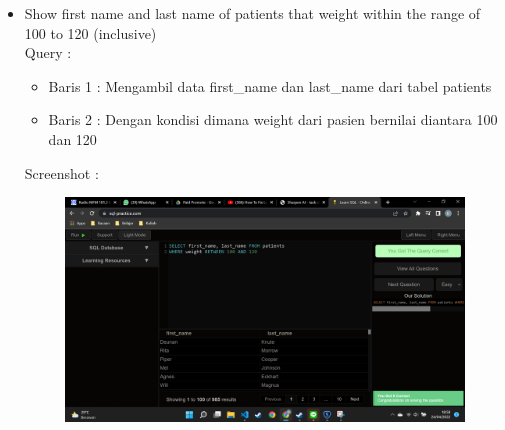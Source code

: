 \documentclass[]{article}
\begin{document}
\begin{itemize}
        \item Show first name and last name of patients that weight within the range of 100 to 120 (inclusive)
        \\Query :
        
        \begin{itemize}
            \item Baris 1 : Mengambil data first\_name dan last\_name dari tabel patients
            \item Baris 2 : Dengan kondisi dimana weight dari pasien bernilai diantara 100 dan 120
        \end{itemize}
        Screenshot :
        \begin{figure}[h]
            \includegraphics[scale=0.3]{./Screenshot/Easy-4.png}
            \centering
        \end{figure}


\end{itemize}
\end{document}
